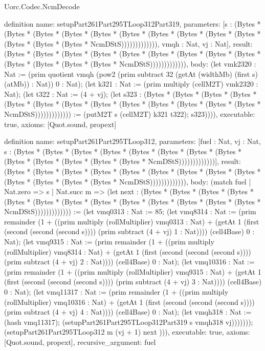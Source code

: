 \begin{lexlean}{Uorc.Codec.NcmDecode}
\begin{semanticmodule}
definition{
  name: setupPart261Part295TLoop312Part319,
  parameters: [s : (Bytes * (Bytes * (Bytes * (Bytes * (Bytes * (Bytes * (Bytes * (Bytes * (Bytes * (Bytes * (Bytes * (Bytes * (Bytes * NcmDStS))))))))))))), vmqh : Nat, vj : Nat],
  result: (Bytes * (Bytes * (Bytes * (Bytes * (Bytes * (Bytes * (Bytes * (Bytes * (Bytes * (Bytes * (Bytes * (Bytes * (Bytes * NcmDStS))))))))))))),
  body: (let vmk2320 : Nat := (prim quotient vmqh (pow2 (prim subtract 32 (getAt (widthMb) (first s) (atMb)) : Nat)) 0 : Nat); (let k321 : Nat := (prim multiply (cellM2T) vmk2320 : Nat); (let t322 : Nat := (4 + vj); (let s323 : (Bytes * (Bytes * (Bytes * (Bytes * (Bytes * (Bytes * (Bytes * (Bytes * (Bytes * (Bytes * (Bytes * (Bytes * (Bytes * NcmDStS))))))))))))) := (putM2T s (cellM2T) k321 t322); s323)))),
  executable: true,
  axioms: [Quot.sound, propext]
}

definition{
  name: setupPart261Part295TLoop312,
  parameters: [fuel : Nat, vj : Nat, s : (Bytes * (Bytes * (Bytes * (Bytes * (Bytes * (Bytes * (Bytes * (Bytes * (Bytes * (Bytes * (Bytes * (Bytes * (Bytes * NcmDStS)))))))))))))],
  result: (Bytes * (Bytes * (Bytes * (Bytes * (Bytes * (Bytes * (Bytes * (Bytes * (Bytes * (Bytes * (Bytes * (Bytes * (Bytes * NcmDStS))))))))))))),
  body: (match fuel
    | Nat.zero => s
    | Nat.succ m => (let next : (Bytes * (Bytes * (Bytes * (Bytes * (Bytes * (Bytes * (Bytes * (Bytes * (Bytes * (Bytes * (Bytes * (Bytes * (Bytes * NcmDStS))))))))))))) := (let vmq0313 : Nat := 85; (let vmq8314 : Nat := (prim remainder (1 + ((prim multiply (rollMultiplier) vmq0313 : Nat) + (getAt 1 (first (second (second (second s)))) (prim subtract (4 + vj) 1 : Nat)))) (cell4Base) 0 : Nat); (let vmq9315 : Nat := (prim remainder (1 + ((prim multiply (rollMultiplier) vmq8314 : Nat) + (getAt 1 (first (second (second (second s)))) (prim subtract (4 + vj) 2 : Nat)))) (cell4Base) 0 : Nat); (let vmq10316 : Nat := (prim remainder (1 + ((prim multiply (rollMultiplier) vmq9315 : Nat) + (getAt 1 (first (second (second (second s)))) (prim subtract (4 + vj) 3 : Nat)))) (cell4Base) 0 : Nat); (let vmq11317 : Nat := (prim remainder (1 + ((prim multiply (rollMultiplier) vmq10316 : Nat) + (getAt 1 (first (second (second (second s)))) (prim subtract (4 + vj) 4 : Nat)))) (cell4Base) 0 : Nat); (let vmqh318 : Nat := (hash vmq11317); (setupPart261Part295TLoop312Part319 s vmqh318 vj))))))); (setupPart261Part295TLoop312 m (vj + 1) next ))),
  executable: true,
  axioms: [Quot.sound, propext],
  recursive_argument: fuel
}


\end{semanticmodule}
\end{lexlean}
